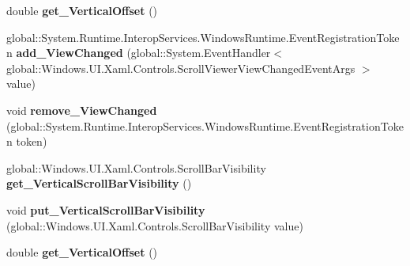 \begin{DoxyCompactItemize}
\mbox{\label{interface_windows_1_1_u_i_1_1_xaml_1_1_controls_1_1_i_scroll_viewer_a40e7998d40517b4dcca9be65562ea770}} 
double {\bfseries get\+\_\+\+Vertical\+Offset} ()
\item 
\mbox{\label{interface_windows_1_1_u_i_1_1_xaml_1_1_controls_1_1_i_scroll_viewer_a8195e80e232dd0a3a3e52e8060f878bc}} 
global\+::\+System.\+Runtime.\+Interop\+Services.\+Windows\+Runtime.\+Event\+Registration\+Token {\bfseries add\+\_\+\+View\+Changed} (global\+::\+System.\+Event\+Handler$<$ global\+::\+Windows.\+U\+I.\+Xaml.\+Controls.\+Scroll\+Viewer\+View\+Changed\+Event\+Args $>$ value)
\item 
\mbox{\label{interface_windows_1_1_u_i_1_1_xaml_1_1_controls_1_1_i_scroll_viewer_a3176001cb06e45e61bbee6a898c4c7b3}} 
void {\bfseries remove\+\_\+\+View\+Changed} (global\+::\+System.\+Runtime.\+Interop\+Services.\+Windows\+Runtime.\+Event\+Registration\+Token token)
\item 
\mbox{\label{interface_windows_1_1_u_i_1_1_xaml_1_1_controls_1_1_i_scroll_viewer_aac8cb7fc3dab5e040635188c0f681107}} 
global\+::\+Windows.\+U\+I.\+Xaml.\+Controls.\+Scroll\+Bar\+Visibility {\bfseries get\+\_\+\+Vertical\+Scroll\+Bar\+Visibility} ()
\item 
\mbox{\label{interface_windows_1_1_u_i_1_1_xaml_1_1_controls_1_1_i_scroll_viewer_a881abbaa0ee412df9ed83e36357e1086}} 
void {\bfseries put\+\_\+\+Vertical\+Scroll\+Bar\+Visibility} (global\+::\+Windows.\+U\+I.\+Xaml.\+Controls.\+Scroll\+Bar\+Visibility value)
\item 
\mbox{\label{interface_windows_1_1_u_i_1_1_xaml_1_1_controls_1_1_i_scroll_viewer_a40e7998d40517b4dcca9be65562ea770}} 
double {\bfseries get\+\_\+\+Vertical\+Offset} ()
\item 
\mbox{\label{interface_windows_1_1_u_i_1_1_xaml_1_1_controls_1_1_i_scroll_viewer_a8195e80e232dd0a3a3e52e8060f878bc}} 

\end{DoxyCompactItemize}

